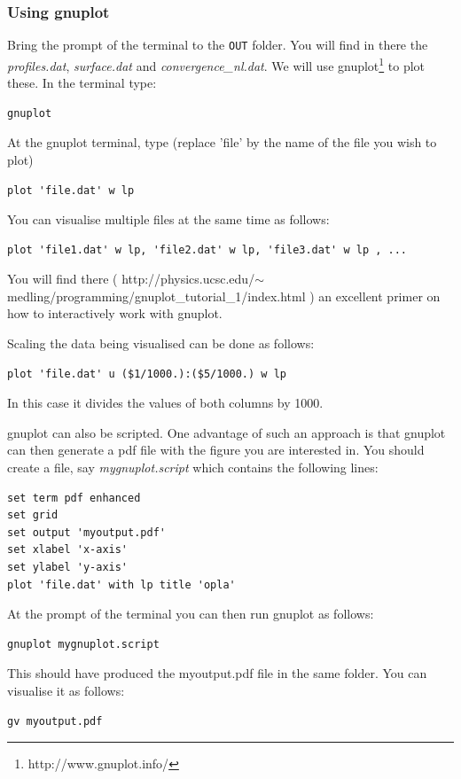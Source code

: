 \documentclass[a4paper]{article}
\begin{document}
\subsubsection{Using gnuplot}

Bring the prompt of the terminal to the {\tt OUT} folder. You will find in there the 
{\sl profiles.dat}, {\sl surface.dat} and {\sl convergence\_nl.dat}.
We will use gnuplot\footnote{http://www.gnuplot.info/} to plot these. In the terminal type:
\begin{verbatim}
gnuplot
\end{verbatim}
At the gnuplot terminal, type (replace 'file' by the name of the file you wish to plot)
\begin{verbatim}
plot 'file.dat' w lp 
\end{verbatim}

You can visualise multiple files at the same time as follows:
\begin{verbatim}
plot 'file1.dat' w lp, 'file2.dat' w lp, 'file3.dat' w lp , ... 
\end{verbatim}
You will find there ( http://physics.ucsc.edu/$\sim$medling/programming/gnuplot\_tutorial\_1/index.html ) an excellent primer on how to interactively work with gnuplot.

Scaling the data being visualised can be done as follows:
\begin{verbatim}
plot 'file.dat' u ($1/1000.):($5/1000.) w lp
\end{verbatim}
In this case it divides the values of both columns by 1000.

gnuplot can also be scripted. One advantage of such an approach is that gnuplot can then generate a pdf file with the figure you are interested in. You should create a file, say {\sl mygnuplot.script} which contains the following lines:
\begin{verbatim}
set term pdf enhanced
set grid
set output 'myoutput.pdf'
set xlabel 'x-axis'
set ylabel 'y-axis'
plot 'file.dat' with lp title 'opla'
\end{verbatim}

At the prompt of the terminal you can then run gnuplot as follows:
\begin{verbatim}
gnuplot mygnuplot.script
\end{verbatim}
This should have produced the myoutput.pdf file in the same folder.
You can visualise it as follows:
\begin{verbatim}
gv myoutput.pdf
\end{verbatim}
\end{document}
